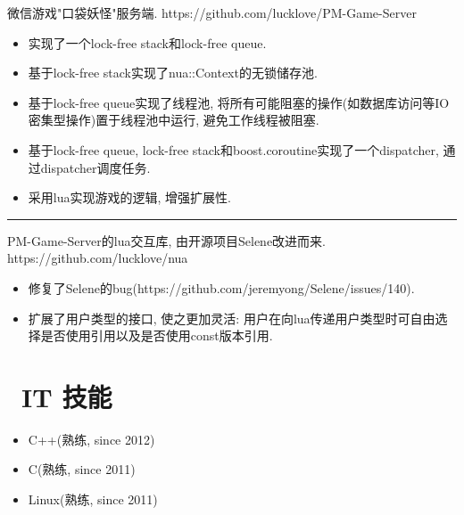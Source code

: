 \documentclass[UTF8]{resume}
\newcommand{\subsectionrule}{{\vspace{-8pt}\hspace{0.5cm}\rule[1pt]{\linewidth-1cm}{0.05pt}\vspace{-8pt}}}
\begin{document}
\begin{onehalfspacing}
微信游戏"口袋妖怪"服务端.
\newline
https://github.com/lucklove/PM-Game-Server
\begin{itemize}
  \item 实现了一个lock-free stack和lock-free queue.
  \item 基于lock-free stack实现了nua::Context的无锁储存池.
  \item 基于lock-free queue实现了线程池, 将所有可能阻塞的操作(如数据库访问等IO密集型操作)置于线程池中运行, 避免工作线程被阻塞.
  \item 基于lock-free queue, lock-free stack和boost.coroutine实现了一个dispatcher, 通过dispatcher调度任务.
  \item 采用lua实现游戏的逻辑, 增强扩展性.
\end{itemize}
\end{onehalfspacing}

\subsectionrule

\begin{onehalfspacing}
PM-Game-Server的lua交互库, 由开源项目Selene改进而来.
\newline
https://github.com/lucklove/nua
\begin{itemize}
  \item 修复了Selene的bug(https://github.com/jeremyong/Selene/issues/140).
  \item 扩展了用户类型的接口, 使之更加灵活: 用户在向lua传递用户类型时可自由选择是否使用引用以及是否使用const版本引用.
\end{itemize}
\end{onehalfspacing}



\section{\faCogs\ IT 技能}
\begin{itemize}[parsep=0.5ex]
  \item C++(熟练, since 2012)
  \item C(熟练, since 2011)
  \item Linux(熟练, since 2011)
\end{itemize}
\end{document}
